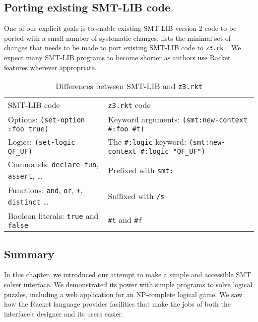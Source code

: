 \subsection{Porting existing SMT-LIB code}
\label{sec:porting-smt-lib}

One of our explicit goals is to enable existing SMT-LIB version 2 code to be
ported with a small number of systematic changes. 
lists the minimal set of changes that needs to be made to port
existing SMT-LIB code to \texttt{z3.rkt}. We expect many SMT-LIB programs
to become shorter as authors use Racket features wherever appropriate.

\begin{table}[hbt]
\caption{Differences between SMT-LIB and \texttt{z3.rkt}}
\label{tab:smt-porting}
\begin{center}
\begin{tabularx}{0.91\textwidth}{lX}
\hline\noalign{\smallskip}
SMT-LIB code & \texttt{z3.rkt} code \\
\noalign{\smallskip}
\hline
\noalign{\smallskip}
Options: \texttt{(set-option :foo true)} & Keyword arguments: \newline \texttt{(smt:new-context \#:foo \#t)} \\

Logics: \texttt{(set-logic QF\_UF)} & The \texttt{\#:logic} keyword: \newline \texttt{(smt:new-context \#:logic "QF\_UF")} \\

Commands: \texttt{declare-fun}, \texttt{assert}, \ldots & Prefixed with \texttt{smt:} \\

Functions: \texttt{and}, \texttt{or}, \texttt{+}, \texttt{distinct} \ldots & Suffixed with \texttt{/s} \\

Boolean literals: \texttt{true} and \texttt{false} & \texttt{\#t} and \texttt{\#f} \\

\hline
\end{tabularx}
\end{center}
\end{table}

\subsection*{Summary}

In this chapter, we introduced our attempt to make a simple and accessible SMT
solver interface. We demonstrated its power with simple programs to solve
logical puzzles, including a web application for an NP-complete logical game.
We saw how the Racket language provides facilities that make the jobs of both
the interface's designer and its users easier.
